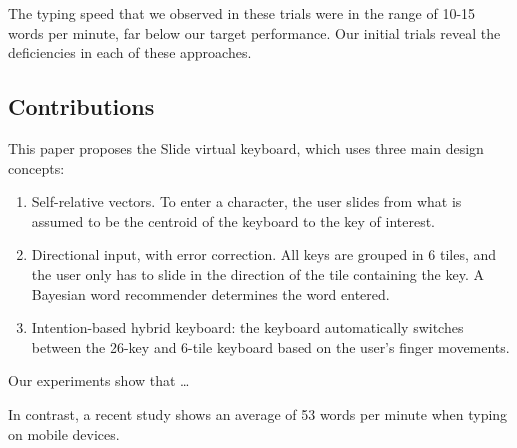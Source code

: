 The typing speed that we observed in these trials were in the range of 10-15 words per minute, far below our target performance.  Our initial trials reveal the deficiencies in each of these approaches.

\subsection{Contributions}
This paper proposes the Slide virtual keyboard, which uses three main design concepts: 
\begin{enumerate}
\item
Self-relative vectors.  To enter a character, the user slides from what is assumed to be the centroid of the keyboard to the key of interest.  

\item
Directional input, with error correction.  All keys are grouped in 6 tiles, and the user only has to slide in the direction of the tile containing the key.  A Bayesian word recommender determines the word entered. 

\item
Intention-based hybrid keyboard: the keyboard automatically switches between the 26-key and 6-tile keyboard based on the user's finger movements.  
\end{enumerate}

Our experiments show that …

In contrast, a recent study shows an average of 53 words per minute when typing on mobile devices\cite{landay}.

